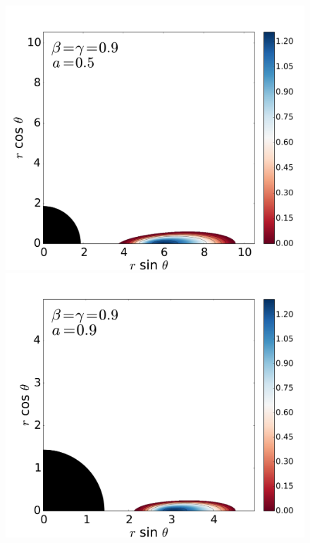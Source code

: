 \documentclass{aa}
\begin{document}
\begin{figure}
\includegraphics[scale=0.14]{figures/fig2_3_1.pdf}
\hspace{-0.3cm}
\includegraphics[scale=0.14]{figures/fig2_3_2.pdf}
\hspace{-0.2cm}

\end{figure}
\end{document}
